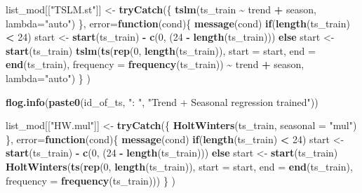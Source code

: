 \documentclass[
]{article}
\newenvironment{Shaded}{\begin{snugshade}}{\end{snugshade}}
\newcommand{\AttributeTok}[1]{\textcolor[rgb]{0.13,0.29,0.53}{#1}}
\newcommand{\ControlFlowTok}[1]{\textcolor[rgb]{0.13,0.29,0.53}{\textbf{#1}}}
\newcommand{\DecValTok}[1]{\textcolor[rgb]{0.00,0.00,0.81}{#1}}
\newcommand{\FunctionTok}[1]{\textcolor[rgb]{0.13,0.29,0.53}{\textbf{#1}}}
\newcommand{\NormalTok}[1]{#1}
\newcommand{\OtherTok}[1]{\textcolor[rgb]{0.56,0.35,0.01}{#1}}
\newcommand{\SpecialCharTok}[1]{\textcolor[rgb]{0.81,0.36,0.00}{\textbf{#1}}}
\newcommand{\StringTok}[1]{\textcolor[rgb]{0.31,0.60,0.02}{#1}}
\begin{document}
\begin{Shaded}
\begin{Highlighting}[]
\NormalTok{  list\_mod[[}\StringTok{"TSLM.st"}\NormalTok{]] }\OtherTok{\textless{}{-}} \FunctionTok{tryCatch}\NormalTok{(\{}
    \FunctionTok{tslm}\NormalTok{(ts\_train }\SpecialCharTok{\textasciitilde{}}\NormalTok{ trend }\SpecialCharTok{+}\NormalTok{ season, }\AttributeTok{lambda=}\StringTok{"auto"}\NormalTok{)}
\NormalTok{  \},}
  \AttributeTok{error=}\ControlFlowTok{function}\NormalTok{(cond)\{}
    \FunctionTok{message}\NormalTok{(cond) }
    \ControlFlowTok{if}\NormalTok{(}\FunctionTok{length}\NormalTok{(ts\_train) }\SpecialCharTok{\textless{}} \DecValTok{24}\NormalTok{) start }\OtherTok{\textless{}{-}} \FunctionTok{start}\NormalTok{(ts\_train) }\SpecialCharTok{{-}} \FunctionTok{c}\NormalTok{(}\DecValTok{0}\NormalTok{, (}\DecValTok{24} \SpecialCharTok{{-}} \FunctionTok{length}\NormalTok{(ts\_train)))}
    \ControlFlowTok{else}\NormalTok{ start }\OtherTok{\textless{}{-}} \FunctionTok{start}\NormalTok{(ts\_train)}
    \FunctionTok{tslm}\NormalTok{(}\FunctionTok{ts}\NormalTok{(}\FunctionTok{rep}\NormalTok{(}\DecValTok{0}\NormalTok{, }\FunctionTok{length}\NormalTok{(ts\_train)), }\AttributeTok{start =}\NormalTok{ start, }\AttributeTok{end =} \FunctionTok{end}\NormalTok{(ts\_train), }\AttributeTok{frequency =} \FunctionTok{frequency}\NormalTok{(ts\_train)) }\SpecialCharTok{\textasciitilde{}}\NormalTok{ trend }\SpecialCharTok{+}\NormalTok{ season, }\AttributeTok{lambda=}\StringTok{"auto"}\NormalTok{)}
\NormalTok{  \}}
\NormalTok{  )}

  \FunctionTok{flog.info}\NormalTok{(}\FunctionTok{paste0}\NormalTok{(id\_of\_ts, }\StringTok{": "}\NormalTok{, }\StringTok{"Trend + Seasonal regression trained"}\NormalTok{))}

\NormalTok{  list\_mod[[}\StringTok{"HW.mul"}\NormalTok{]] }\OtherTok{\textless{}{-}} \FunctionTok{tryCatch}\NormalTok{(\{}
    \FunctionTok{HoltWinters}\NormalTok{(ts\_train, }\AttributeTok{seasonal =} \StringTok{"mul"}\NormalTok{)}
\NormalTok{  \},}
  \AttributeTok{error=}\ControlFlowTok{function}\NormalTok{(cond)\{}
    \FunctionTok{message}\NormalTok{(cond)}
    \ControlFlowTok{if}\NormalTok{(}\FunctionTok{length}\NormalTok{(ts\_train) }\SpecialCharTok{\textless{}} \DecValTok{24}\NormalTok{) start }\OtherTok{\textless{}{-}} \FunctionTok{start}\NormalTok{(ts\_train) }\SpecialCharTok{{-}} \FunctionTok{c}\NormalTok{(}\DecValTok{0}\NormalTok{, (}\DecValTok{24} \SpecialCharTok{{-}} \FunctionTok{length}\NormalTok{(ts\_train)))}
    \ControlFlowTok{else}\NormalTok{ start }\OtherTok{\textless{}{-}} \FunctionTok{start}\NormalTok{(ts\_train)}
    \FunctionTok{HoltWinters}\NormalTok{(}\FunctionTok{ts}\NormalTok{(}\FunctionTok{rep}\NormalTok{(}\DecValTok{0}\NormalTok{, }\FunctionTok{length}\NormalTok{(ts\_train)), }\AttributeTok{start =}\NormalTok{ start, }\AttributeTok{end =} \FunctionTok{end}\NormalTok{(ts\_train), }\AttributeTok{frequency =} \FunctionTok{frequency}\NormalTok{(ts\_train)))}
\NormalTok{  \}}
\NormalTok{  )}


\end{Highlighting}
\end{Shaded}
\end{document}
